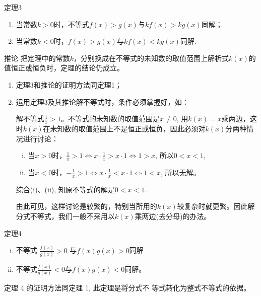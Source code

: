 \begin{thm}{定理3}
\begin{enumerate}
    \item 当常数$k>0$时，不等式$f(x)>g(x)$与$kf(x)>kg(x)$同解；
    \item 当常数$k<0$时，$f(x)>g(x)$与$kf(x)<kg(x)$同解.
\end{enumerate}
\end{thm}

\begin{thm}{推论}
    把定理中的常数$k$，分别换成在不等式的未知数的取值范围上解析式$k(x)$的值恒正或恒负时，定理的结论仍成立。    
\end{thm}

\begin{note}
\begin{enumerate}[(1)]
    \item 定理3和推论的证明方法同定理1；
    \item 运用定理3及其推论解不等式时，条件必须掌握好，如：

    解不等式$\frac1x>1$。不等式的未知数的取值范围是$x\neq0$, 用$k\left(x\right)=x$乘两边，这时$k\left(x\right)$在未知数的取值范围上不是恒正或恒负，因此必须对$k(x)$分两种情况进行讨论：
    \begin{enumerate}[(i)]
    \item 当$x>0$时，$\frac1x>1{\Longleftrightarrow}x\cdot\frac1x{>}x{\cdot}1{\Longleftrightarrow}1{>}x$,
    所以$0<x<1$,
    \item 当$x<0$时，$-\frac1x>1\Longleftrightarrow x\cdot\frac1x<x\cdot1\Longleftrightarrow1<x$, 所以无解。
    \end{enumerate}
    综合(i)、(ii), 知原不等式的解是$0<x<1$.
    
    由此可见，这样讨论是较繁的，特别当所用的$k(x)$较复杂时就更繁。因此解分式不等式，我们一般不采用以$k(x)$乘两边(去分母)的办法。
\end{enumerate}
\end{note}

\begin{thm}{定理4}
\begin{enumerate}[(i)]
    \item 不等式 $\frac {f(x)}{g(x)}>0$ 与$f(x)g(x)>0$同解
    \item 不等式$\frac {f(x)}{g(x)}<0$与$f(x)g(x)<0$同解。
\end{enumerate}
\end{thm}

\begin{note}
    定理 4 的证明方法同定理 1, 此定理是将分式不
等式转化为整式不等式的依据。
\end{note}

